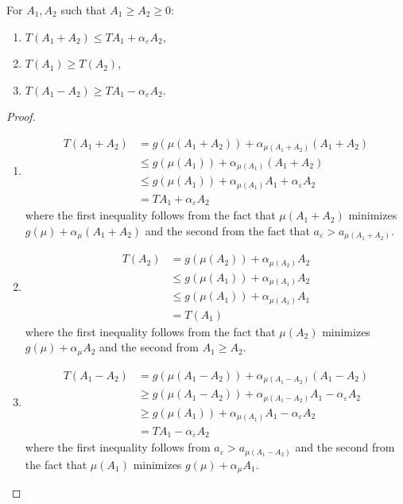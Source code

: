 \begin{lemma}\label{lemma:Tproperties}
	For $A_1,A_2$ such that $A_1\geq A_2\geq 0$: 
	\begin{enumerate}
		\item $T(A_1+A_2)\leq TA_1+\alpha_\varepsilon A_2$,
		\item $T(A_1)\geq T(A_2)$,
		\item $T(A_1-A_2)\geq TA_1-\alpha_\varepsilon A_2$.
	\end{enumerate}
	\begin{proof}
		\begin{enumerate}
			\item 
			\begin{equation}
			\begin{split}
			T(A_1+A_2)&=g(\mu(A_1+A_2))+\alpha_{\mu(A_1+A_2)}(A_1+A_2)\\
			&\leq g(\mu(A_1))+\alpha_{\mu(A_1)}(A_1+A_2)\\
			&\leq g(\mu(A_1))+\alpha_{\mu(A_1)}A_1+\alpha_\varepsilon A_2\\
			&=TA_1+\alpha_\varepsilon A_2
			\end{split}
			\end{equation} 
			where the first inequality follows from the fact that $\mu(A_1+A_2)$ minimizes $g(\mu)+\alpha_\mu (A_1+A_2)$ and the second from the fact that $a_\varepsilon>a_{\mu(A_1+A_2)}$.
			\item 
			\begin{equation}
			\begin{split}
			T(A_2)&=g(\mu(A_2))+\alpha_{\mu(A_2)}A_2\\
			&\leq g(\mu(A_1))+\alpha_{\mu(A_1)}A_2\\
			&\leq g(\mu(A_1))+\alpha_{\mu(A_1)}A_1\\
			&=T(A_1)
			\end{split}
			\end{equation}
			where the first inequality follows from the fact that $\mu(A_2)$ minimizes $g(\mu)+\alpha_\mu A_2$ and the second from $A_1\geq A_2$.
			\item 
			\begin{equation}
			\begin{split}
			T(A_1-A_2)&=g(\mu(A_1-A_2))+\alpha_{\mu(A_1-A_2)}(A_1-A_2)\\
			&\geq g(\mu(A_1-A_2))+\alpha_{\mu(A_1-A_2)}A_1 - \alpha_\varepsilon A_2\\
			&\geq g(\mu(A_1))+\alpha_{\mu(A_1)}A_1-\alpha_\varepsilon A_2\\
			&=TA_1-\alpha_\varepsilon A_2
			\end{split}
			\end{equation}
			where the first inequality follows from $a_\varepsilon>a_{\mu(A_1-A_2)}$ and the second from the fact that $\mu(A_1)$ minimizes $g(\mu)+\alpha_\mu A_1$.
		\end{enumerate}
	\end{proof}
\end{lemma}
